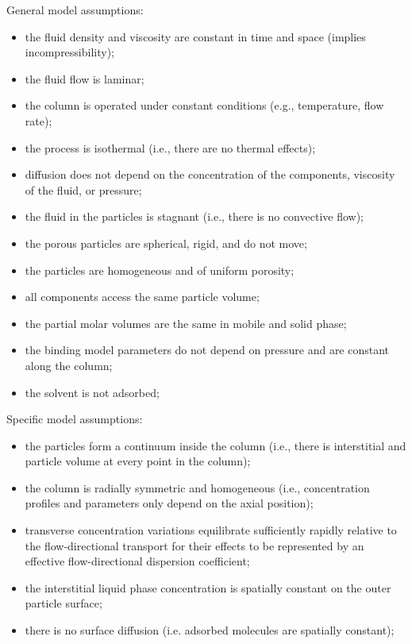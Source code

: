 \documentclass{article}
\begin{document}
General model assumptions:
\begin{itemize}
    \item the fluid density and viscosity are constant in time and space (implies incompressibility);
    \item the fluid flow is laminar;
    \item the column is operated under constant conditions (e.g., temperature, flow rate);
    \item the process is isothermal (i.e., there are no thermal effects);
    \item diffusion does not depend on the concentration of the components, viscosity of the fluid, or pressure;
    \item the fluid in the particles is stagnant (i.e., there is no convective flow);
    \item the porous particles are spherical, rigid, and do not move;
    \item the particles are homogeneous and of uniform porosity;
    \item all components access the same particle volume;
    \item the partial molar volumes are the same in mobile and solid phase;
    \item the binding model parameters do not depend on pressure and are constant along the column;
    \item the solvent is not adsorbed;
\end{itemize}

Specific model assumptions:
\begin{itemize}
    \item the particles form a continuum inside the column (i.e., there is interstitial and particle volume at every point in the column);
    \item the column is radially symmetric and homogeneous (i.e., concentration profiles and parameters only depend on the axial position);
    \item transverse concentration variations equilibrate sufficiently rapidly relative to the flow-directional transport for their effects to be represented by an effective flow-directional dispersion coefficient;
    \item the interstitial liquid phase concentration is spatially constant on the outer particle surface;
    \item there is no surface diffusion (i.e. adsorbed molecules are spatially constant);
\end{itemize}
\end{document}
